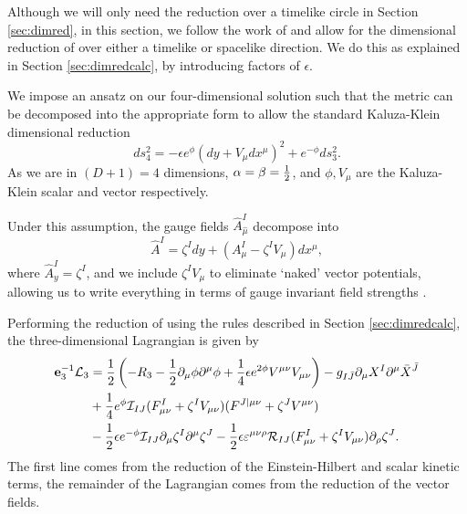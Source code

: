Although we will only need the reduction over a timelike circle in Section \ref{sec:dimred}, in this section, we follow the work of \cite{Mohaupt:2011aa} and allow for the dimensional reduction of  over either a timelike or spacelike direction. We do this as explained in Section \ref{sec:dimredcalc}, by introducing factors of $\epsilon$. 

We impose an ansatz on our four-dimensional solution such that the metric can be decomposed into the appropriate form to allow the standard Kaluza-Klein dimensional reduction
\begin{equation}
\label{eq:KKant}
ds_4^2 = -\epsilon e^\phi (dy + V_\mu dx^\mu)^2 + e^{-\phi} ds_3^2.
\end{equation}
As we are in $(D + 1) = 4$ dimensions, $\alpha = \beta = \frac{1}{2}$, and $\phi, V_\mu$ are the Kaluza-Klein scalar and vector respectively. 

Under this assumption, the gauge fields $\hat{A}^I_{\hat{\mu}}$ decompose into
\begin{equation*}
	\hat{A}^I = \zeta^I dy + (A_\mu^I - \zeta^I V_\mu ) dx^\mu,
\end{equation*}
where $\hat{A}^I_{y} = \zeta^I$, and we include $\zeta^I V_\mu$ to eliminate `naked' vector potentials, allowing us to write everything in terms of gauge invariant field strengths \cite{Cortes:2015wca}.

Performing the reduction of  using the rules described in Section \ref{sec:dimredcalc}, the three-dimensional Lagrangian is given by
\begin{equation}
\begin{aligned}
 \mathbf{e}_3^{-1} {\cal L}_3 &= \frac{1}{2}\left(-R_3 - \frac{1}{2}\partial_\mu \phi \partial^\mu \phi + \frac{1}{4}\epsilon e^{2\phi}V^{\mu\nu} V_{\mu\nu} \right) - g_{I\bar{J}} \partial_\mu X^I \partial^\mu \bar{X}^{\bar{J}} \\
 &+ \frac{1}{4}e^\phi {\cal I}_{IJ}(F^I_{\mu\nu} + \zeta^IV_{\mu\nu})(F^{J|\mu\nu} + \zeta^JV^{\mu\nu}) \\
 &- \frac{1}{2}\epsilon e^{-\phi} {\cal I}_{IJ} \partial_\mu\zeta^I \partial^\mu \zeta^J - \frac{1}{2} \epsilon {\varepsilon}^{\mu\nu\rho} {\cal R}_{IJ}(F^I_{\mu\nu} + \zeta^IV_{\mu\nu})\partial_\rho\zeta^J .
\end{aligned}
\end{equation}
The first line comes from the reduction of the Einstein-Hilbert and scalar kinetic terms, the remainder of the Lagrangian comes from the reduction of the vector fields. 

